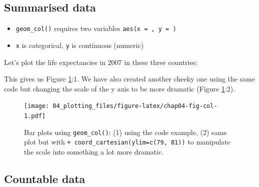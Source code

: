 \documentclass[
  12pt,
  krantz2]{krantz}
\makeatletter
\newenvironment{Shaded}{\begin{snugshade}}{\end{snugshade}}
\newcommand{\DataTypeTok}[1]{\textcolor[rgb]{0.13,0.29,0.53}{#1}}
\newcommand{\KeywordTok}[1]{\textcolor[rgb]{0.13,0.29,0.53}{\textbf{#1}}}
\newcommand{\NormalTok}[1]{#1}
\newcommand{\OperatorTok}[1]{\textcolor[rgb]{0.81,0.36,0.00}{\textbf{#1}}}
\newcommand{\StringTok}[1]{\textcolor[rgb]{0.31,0.60,0.02}{#1}}
\providecommand{\tightlist}{%
  \setlength{\itemsep}{0pt}\setlength{\parskip}{0pt}}
\newenvironment{kframe}{%
\medskip{}
\setlength{\fboxsep}{.8em}
 \def\at@end@of@kframe{}%
 \ifinner\ifhmode%
  \def\at@end@of@kframe{\end{minipage}}%
  \begin{minipage}{\columnwidth}%
 \fi\fi%
 \def\FrameCommand##1{\hskip\@totalleftmargin \hskip-\fboxsep
 \colorbox{shadecolor}{##1}\hskip-\fboxsep
     \hskip-\linewidth \hskip-\@totalleftmargin \hskip\columnwidth}%
 \MakeFramed {\advance\hsize-\width
   \@totalleftmargin\z@ \linewidth\hsize
   \@setminipage}}%
 {\par\unskip\endMakeFramed%
 \at@end@of@kframe}
\renewenvironment{Shaded}{\begin{kframe}}{\end{kframe}}
\makeatother
\begin{document}
\hypertarget{summarised-data}{%
\subsection{Summarised data}\label{summarised-data}}

\begin{itemize}
\tightlist
\item
  \texttt{geom\_col()} requires two variables \texttt{aes(x\ =\ ,\ y\ =\ )}
\item
  \texttt{x} is categorical, \texttt{y} is continuous (numeric)
\end{itemize}

Let's plot the life expectancies in 2007 in these three countries:

\begin{Shaded}
\end{Shaded}

This gives us Figure \ref{fig:chap04-fig-col}:1.
We have also created another cheeky one using the same code but changing the scale of the y axis to be more dramatic (Figure \ref{fig:chap04-fig-col}:2).

\begin{figure}
\centering
\texttt{[image: 04\_plotting\_files/figure-latex/chap04-fig-col-1.pdf]}
\caption{\label{fig:chap04-fig-col}Bar plots using \texttt{geom\_col()}: (1) using the code example, (2) same plot but with \texttt{+\ coord\_cartesian(ylim=c(79,\ 81))} to manipulate the scale into something a lot more dramatic.}
\end{figure}

\FloatBarrier

\hypertarget{countable-data}{%
\subsection{Countable data}\label{countable-data}}
\end{document}
